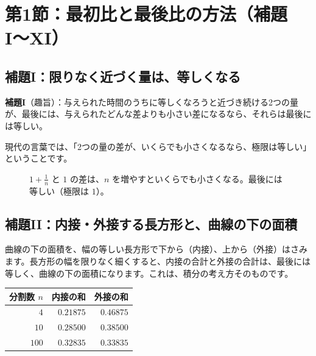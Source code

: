 \documentclass[a4paper,11pt,openany]{ltjsbook}
\begin{document}
\section{第1節：最初比と最後比の方法（補題I〜XI）}

\subsection{補題I：限りなく近づく量は、等しくなる}

\textbf{補題I}（趣旨）：与えられた時間のうちに等しくなろうと近づき続ける2つの量が、最後には、与えられたどんな差よりも小さい差になるなら、それらは最後には等しい。

現代の言葉では、「2つの量の差が、いくらでも小さくなるなら、極限は等しい」ということです。

\begin{figure}[htbp]
\centering
{}
\caption{$1+\frac1n$ と $1$ の差は、$n$ を増やすといくらでも小さくなる。最後には等しい（極限は $1$）。}
\end{figure}

\subsection{補題II：内接・外接する長方形と、曲線の下の面積}

曲線の下の面積を、幅の等しい長方形で下から（内接）、上から（外接）はさみます。長方形の幅を限りなく細くすると、内接の合計と外接の合計は、最後には等しく、曲線の下の面積になります。これは、積分の考え方そのものです。

\begin{center}
\begin{tabular}{rrr}
\toprule
分割数 $n$ & 内接の和 & 外接の和\\
\midrule
$4$ & $0.21875$ & $0.46875$\\
$10$ & $0.28500$ & $0.38500$\\
$100$ & $0.32835$ & $0.33835$\\
\bottomrule
\end{tabular}
\end{center}
\end{document}
